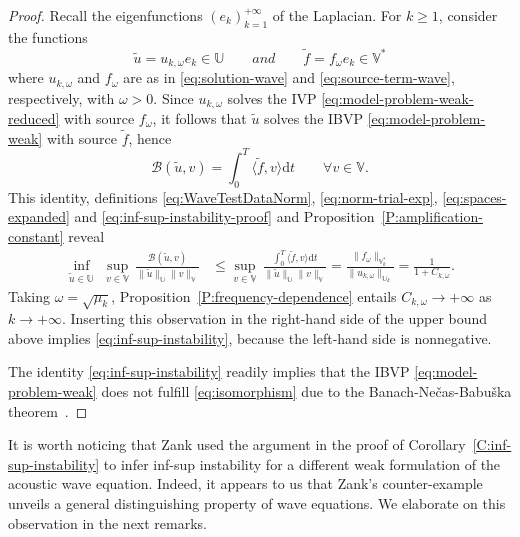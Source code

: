 \documentclass{amsart}
\theoremstyle{plain}
\theoremstyle{remark}
\numberwithin{equation}{section}
\numberwithin{theorem}{section}
\newcommand{\trial}{\mathbb{U}}
\newcommand{\test}{\mathbb{V}}
\newcommand{\data}{\mathbb{V}^*}
\newcommand{\dt}{\mathrm{d}t}
\begin{document}
\begin{proof}
Recall the eigenfunctions $(e_k)_{k=1}^{+\infty}$ of the Laplacian. For $k\geq 1$, consider the functions 
\begin{equation}
\label{eq:inf-sup-instability-proof}
\widetilde{u} = u_{k,\omega} e_k \in \trial
\qquad \textit{and} \qquad
\widetilde f = f_\omega e_k \in \data
\end{equation}
where $u_{k,\omega}$ and $f_\omega$ are as in \eqref{eq:solution-wave} and \eqref{eq:source-term-wave}, respectively, with $\omega > 0$. Since $u_{k, \omega}$ solves the IVP \eqref{eq:model-problem-weak-reduced} with source $f_\omega$, it follows that $\widetilde u$ solves the IBVP \eqref{eq:model-problem-weak} with source $\widetilde f$, hence
\begin{equation*}
	\mathcal{B} (\widetilde u, v) = \int_0^T \langle \widetilde f, v\rangle \dt \qquad\forall v \in \test.
\end{equation*}
This identity, definitions \eqref{eq:WaveTestDataNorm}, \eqref{eq:norm-trial-exp}, \eqref{eq:spaces-expanded} and \eqref{eq:inf-sup-instability-proof} and Proposition~\ref{P:amplification-constant} reveal
\begin{equation*}
\begin{split}
	\inf_{\widetilde u \in \trial}\,\,\sup _{v \in \test} \,\frac{\mathcal{B}(\widetilde u,v)}{\|\widetilde u\|_\trial\|v\|_\test} 
	&\leq
\sup _{v \in \test} \,\frac{\int_0^T \langle \widetilde f, v\rangle \dt}{\|\widetilde u\|_\trial\|v\|_\test} 
= 
\frac{\|f_\omega\|_{\data_k}}{\|u_{k,\omega}\|_{\trial_k}}
=
\frac{1}{1 + C_{k, \omega}}.
\end{split}
\end{equation*}
Taking $\omega = \sqrt{\mu_k}$, Proposition~\ref{P:frequency-dependence} entails $C_{k, \omega} \to +\infty$ as $k \to +\infty$. Inserting this observation in the right-hand side of the upper bound above implies \eqref{eq:inf-sup-instability}, because the left-hand side is nonnegative. 

The identity \eqref{eq:inf-sup-instability} readily implies that the IBVP \eqref{eq:model-problem-weak} does not fulfill \eqref{eq:isomorphism}  due to the Banach-Ne\v{c}as-Babu\v{s}ka theorem~\cite[Theorem~25.9]{Ern.Guermond:21-II}.
\end{proof}

It is worth noticing that Zank \cite{Zank:20} used the argument in the proof of Corollary~\ref{C:inf-sup-instability} to infer inf-sup instability for a different weak formulation of the acoustic wave equation. Indeed, it appears to us that Zank's counter-example unveils a general distinguishing property of wave equations. We elaborate on this observation in the next remarks.
\end{document}
